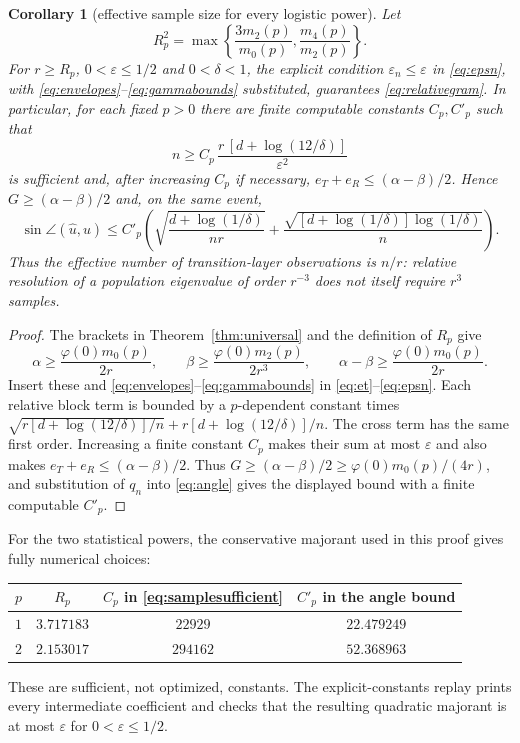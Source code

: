 \documentclass[11pt]{article}
\newtheorem{corollary}[theorem]{Corollary}
\begin{document}
\begin{corollary}[effective sample size for every logistic power]
\label{cor:effective}
Let
\[
 R_p^2=\max\left\{\frac{3m_2(p)}{m_0(p)},\frac{m_4(p)}{m_2(p)}\right\}.
\]
For $r\ge R_p$, $0<\varepsilon\le1/2$ and $0<\delta<1$, the explicit condition
$\varepsilon_n\le\varepsilon$ in \eqref{eq:epsn}, with
\eqref{eq:envelopes}--\eqref{eq:gammabounds} substituted, guarantees
\eqref{eq:relativegram}.  In particular, for each fixed $p>0$ there are finite computable constants $C_p,C'_p$
such that
\begin{equation}
 n\ge C_p\,\frac{r\,[d+\log(12/\delta)]}{\varepsilon^2}
 \label{eq:samplesufficient}
\end{equation}
is sufficient and, after increasing $C_p$ if necessary,
$e_T+e_R\le(\alpha-\beta)/2$.  Hence $G\ge(\alpha-\beta)/2$ and, on the same event,
\[
 \sin\angle(\widehat u,u)
 \le C'_p\!\left(\sqrt{\frac{d+\log(1/\delta)}{nr}}
 +\frac{\sqrt{[d+\log(1/\delta)]\log(1/\delta)}}{n}\right).
\]
Thus the effective number of transition-layer observations is $n/r$: relative resolution of a population
eigenvalue of order $r^{-3}$ does not itself require $r^3$ samples.
\end{corollary}

\begin{proof}
The brackets in Theorem~\ref{thm:universal} and the definition of $R_p$ give
\[
 \alpha\ge\frac{\varphi(0)m_0(p)}{2r},\qquad
 \beta\ge\frac{\varphi(0)m_2(p)}{2r^3},\qquad
 \alpha-\beta\ge\frac{\varphi(0)m_0(p)}{2r}.
\]
Insert these and \eqref{eq:envelopes}--\eqref{eq:gammabounds} in
\eqref{eq:et}--\eqref{eq:epsn}.  Each relative block term is bounded by a $p$-dependent constant times
$\sqrt{r[d+\log(12/\delta)]/n}+r[d+\log(12/\delta)]/n$.
The cross term has the same first order.  Increasing a finite constant $C_p$ makes their sum at most
$\varepsilon$ and also makes $e_T+e_R\le(\alpha-\beta)/2$.  Thus
$G\ge(\alpha-\beta)/2\ge\varphi(0)m_0(p)/(4r)$, and substitution of $q_n$ into
\eqref{eq:angle} gives the displayed bound with a finite computable $C'_p$.
\end{proof}

For the two statistical powers, the conservative majorant used in this proof gives fully numerical choices:
\begin{center}
\begin{tabular}{cccc}
\toprule
$p$ & $R_p$ & $C_p$ in \eqref{eq:samplesufficient} & $C'_p$ in the angle bound\\
\midrule
$1$ & $3.717183$ & $22929$ & $22.479249$\\
$2$ & $2.153017$ & $294162$ & $52.368963$\\
\bottomrule
\end{tabular}
\end{center}
These are sufficient, not optimized, constants.  The explicit-constants replay prints every intermediate
coefficient and checks that the resulting quadratic majorant is at most $\varepsilon$ for
$0<\varepsilon\le1/2$.
\end{document}
